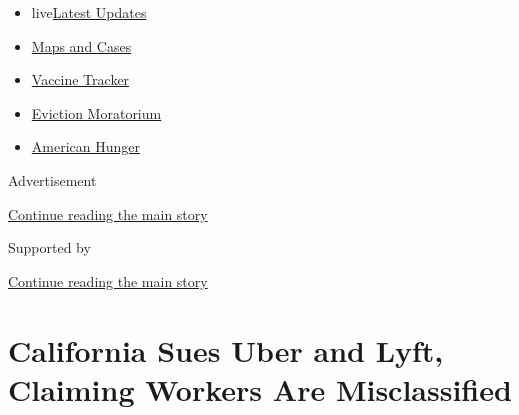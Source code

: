 \begin{itemize}
\tightlist
\item
  live\href{https://www.nytimes3xbfgragh.onion/2020/09/08/world/covid-19-coronavirus.html?name=styln-coronavirus-markets\&region=TOP_BANNER\&block=storyline_menu_recirc\&action=click\&pgtype=Article\&impression_id=4c38b340-f1f4-11ea-9ee4-4b0f9d7721fd\&variant=undefined}{Latest
  Updates}
\item
  \href{https://www.nytimes3xbfgragh.onion/interactive/2020/us/coronavirus-us-cases.html?name=styln-coronavirus-markets\&region=TOP_BANNER\&block=storyline_menu_recirc\&action=click\&pgtype=Article\&impression_id=4c38b341-f1f4-11ea-9ee4-4b0f9d7721fd\&variant=undefined}{Maps
  and Cases}
\item
  \href{https://www.nytimes3xbfgragh.onion/interactive/2020/science/coronavirus-vaccine-tracker.html?name=styln-coronavirus-markets\&region=TOP_BANNER\&block=storyline_menu_recirc\&action=click\&pgtype=Article\&impression_id=4c38b342-f1f4-11ea-9ee4-4b0f9d7721fd\&variant=undefined}{Vaccine
  Tracker}
\item
  \href{https://www.nytimes3xbfgragh.onion/2020/09/02/your-money/eviction-moratorium-covid.html?name=styln-coronavirus-markets\&region=TOP_BANNER\&block=storyline_menu_recirc\&action=click\&pgtype=Article\&impression_id=4c38b343-f1f4-11ea-9ee4-4b0f9d7721fd\&variant=undefined}{Eviction
  Moratorium}
\item
  \href{https://www.nytimes3xbfgragh.onion/interactive/2020/09/02/magazine/food-insecurity-hunger-us.html?name=styln-coronavirus-markets\&region=TOP_BANNER\&block=storyline_menu_recirc\&action=click\&pgtype=Article\&impression_id=4c38b344-f1f4-11ea-9ee4-4b0f9d7721fd\&variant=undefined}{American
  Hunger}
\end{itemize}

Advertisement

\protect\hyperlink{after-top}{Continue reading the main story}

Supported by

\protect\hyperlink{after-sponsor}{Continue reading the main story}

\hypertarget{california-sues-uber-and-lyft-claiming-workers-are-misclassified}{%
\section{California Sues Uber and Lyft, Claiming Workers Are
Misclassified}\label{california-sues-uber-and-lyft-claiming-workers-are-misclassified}}

